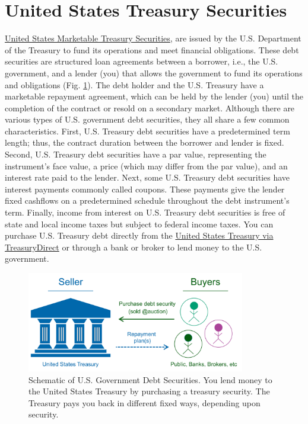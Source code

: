 \documentclass[11pt]{article}
\theoremstyle{definition}
\begin{document}
\section{United States Treasury Securities}
\href{https://www.investor.gov/introduction-investing/investing-basics/glossary/treasury-securities}{United States Marketable Treasury Securities}, 
are issued by the U.S. Department of the Treasury to fund its operations and meet financial obligations. 
These debt securities are structured loan agreements between a borrower, i.e., the U.S. government, and a lender (you) 
that allows the government to fund its operations and obligations (Fig. \ref{fig:govt-debt-schematic}).
The debt holder and the U.S. Treasury have a marketable repayment agreement, which can be held by the lender (you) until the completion of the contract or resold on a secondary market. Although there are various types of U.S. government debt securities, they all share a few common characteristics. 
First, U.S. Treasury debt securities have a predetermined term length; thus, the contract duration between the borrower and lender is fixed.
Second, U.S. Treasury debt securities have a par value, representing the instrument's face value, a price (which may differ from the par value), and an interest rate paid to the lender. Next, some U.S. Treasury debt securities have interest payments commonly called coupons. These payments give the lender fixed cashflows on a predetermined schedule throughout the debt instrument's term. Finally, income from interest on U.S. Treasury debt securities is free of state and local income taxes but subject to federal income taxes.
You can purchase U.S. Treasury debt directly from the \href{https://www.treasurydirect.gov/indiv/products/prod_tbonds_glance.htm}{United States Treasury via TreasuryDirect} 
or through a bank or broker to lend money to the U.S. government.

\begin{figure}[h]
    \centering
    \includegraphics[width=0.85\textwidth]{./figs/Fig-Govt-Debt-Schematic.pdf}
    \caption{Schematic of U.S. Government Debt Securities. You lend money to the United States Treasury by purchasing a treasury security.
	The Treasury pays you back in different fixed ways, depending upon security.}\label{fig:govt-debt-schematic}
\end{figure}
\end{document}
